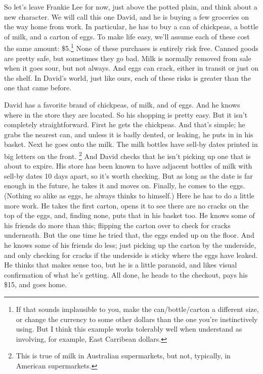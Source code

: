 \documentclass[
  12pt,
]{article}
\begin{document}
So let's leave Frankie Lee for now, just above the potted plain, and think about a new character. We will call this one David, and he is buying a few groceries on the way home from work. In particular, he has to buy a can of chickpeas, a bottle of milk, and a carton of eggs. To make life easy, we'll assume each of these cost the same amount: \$5.\footnote{If that sounds implausible to you, make the can/bottle/carton a different size, or change the currency to some other dollars than the one you're instinctively using. But I think this example works tolerably well when understand as involving, for example, East Carribean dollars.} None of these purchases is entirely risk free. Canned goods are pretty safe, but sometimes they go bad. Milk is normally removed from sale when it goes sour, but not always. And eggs can crack, either in transit or just on the shelf. In David's world, just like ours, each of these risks is greater than the one that came before.

David has a favorite brand of chickpeas, of milk, and of eggs. And he knows where in the store they are located. So his shopping is pretty easy. But it isn't completely straightforward. First he gets the chickpeas. And that's simple; he grabs the nearest can, and unless it is badly dented, or leaking, he puts in in his basket. Next he goes onto the milk. The milk bottles have sell-by dates printed in big letters on the front. \footnote{This is true of milk in Australian supermarkets, but not, typically, in American supermarkets.} And David checks that he isn't picking up one that is about to expire. His store has been known to have adjacent bottles of milk with sell-by dates 10 days apart, so it's worth checking. But as long as the date is far enough in the future, he takes it and moves on. Finally, he comes to the eggs. (Nothing so alike as eggs, he always thinks to himself.) Here he has to do a little more work. He takes the first carton, opens it to see there are no cracks on the top of the eggs, and, finding none, puts that in his basket too. He knows some of his friends do more than this; flipping the carton over to check for cracks underneath. But the one time he tried that, the eggs ended up on the floor. And he knows some of his friends do less; just picking up the carton by the underside, and only checking for cracks if the underside is sticky where the eggs have leaked. He thinks that makes sense too, but he is a little paranoid, and likes visual confirmation of what he's getting. All done, he heads to the checkout, pays his \$15, and goes home.
\end{document}
